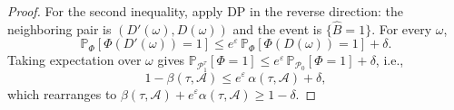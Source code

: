 \documentclass{article}
\theoremstyle{plain}
\theoremstyle{definition}
\theoremstyle{remark}
\newcommand{\cP}{\ensuremath{\mathcal{P}}}
\newcommand{\cA}{\ensuremath{\mathcal{A}}}
\renewcommand{\leq}{\leqslant}
\renewcommand{\geq}{\geqslant}
\newcommand{\bP}{\mathbb{P}}
\begin{document}
\begin{proof}
    For the second inequality, apply DP in the reverse direction: the neighboring pair is $(D'(\omega), D(\omega))$ and the event is $\{\widehat{B} = 1\}$. For every $\omega$,
    \begin{equation*}
        \bP_{\Phi}\!\left[\Phi(D'(\omega)) = 1\right] \leq e^{\varepsilon}\, \bP_{\Phi}\!\left[\Phi(D(\omega)) = 1\right] + \delta.
    \end{equation*}
    Taking expectation over $\omega$ gives $\bP_{\cP_1^{\tau}}[\Phi = 1] \leq e^{\varepsilon}\, \bP_{\cP_0}[\Phi = 1] + \delta$, i.e.,
    \begin{equation*}
        1 - \beta(\tau,\cA) \leq e^{\varepsilon}\, \alpha(\tau,\cA) + \delta,
    \end{equation*}
    which rearranges to $\beta(\tau,\cA) + e^{\varepsilon} \alpha(\tau,\cA) \geq 1 - \delta$.
\end{proof}
\end{document}
